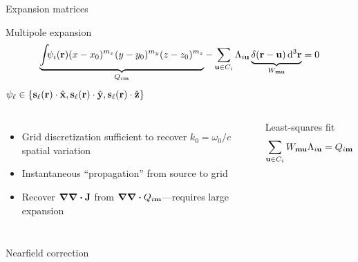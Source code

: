 \documentclass[aspectratio=169, usenames, dvipsnames]{beamer}
\begin{document}
\begin{frame}{Expansion matrices}
  \begin{block}{Multipole expansion}
    \begin{equation*}
      \underbrace{\int_{} \psi_i(\vb{r}) (x - x_0)^{m_x} (y - y_0)^{m_y} (z - z_0)^{m_z}}_{Q_{i\vb{m}}} - \sum_{\vb{u} \in C_i} \Lambda_{i \vb{u}} \underbrace{\delta(\vb{r} - \vb{u}) \dd[3]{\vb{r}}}_{W_{\vb{m}\vb{u}}} = 0
    \end{equation*}
    \hfill $\psi_\ell \in \qty{\vb{s}_\ell(\vb{r}) \cdot \hat{\vb{x}}, \vb{s}_\ell(\vb{r}) \cdot \hat{\vb{y}}, \vb{s}_\ell(\vb{r}) \cdot \hat{\vb{z}}}$
  \end{block}
  \begin{columns}
      \begin{itemize}
        \item Grid discretization sufficient to recover $k_0 = \omega_0/c$ spatial variation
        \item Instantaneous ``propagation'' from source to grid
        \item Recover $\grad \div \vb{J}$ from $\grad \div Q_{i\vb{m}}$---requires large expansion
      \end{itemize}

      \begin{block}{Least-squares fit}
        \begin{equation*}
          \sum_{\vb{u} \in C_i} W_{\vb{m}\vb{u}} \Lambda_{i \vb{u}} = Q_{i\vb{m}}
        \end{equation*}
      \end{block}
  \end{columns}
\end{frame}

\begin{frame}{Nearfield correction}
  \begin{center}
    
  \end{center}
\end{frame}
\end{document}
